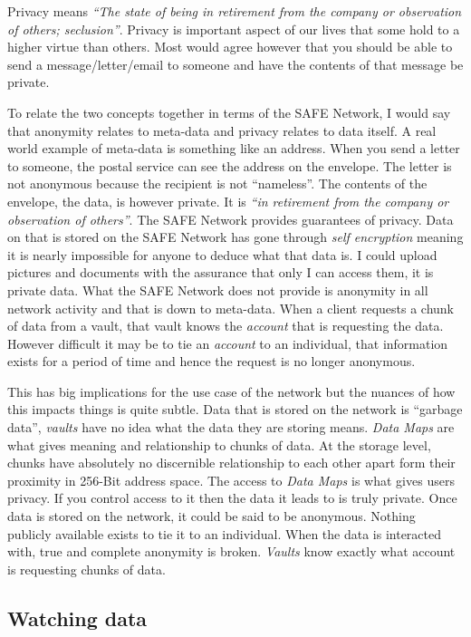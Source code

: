 Privacy means \textit{``The state of being in retirement from the company or observation of others; seclusion''}\cite{privacy}. Privacy is important aspect of our lives that some hold to a higher virtue than others. Most would agree however that you should be able to send a message/letter/email to someone and have the contents of that message be private.

To relate the two concepts together in terms of the SAFE Network, I would say that anonymity relates to meta-data and privacy relates to data itself. A real world example of meta-data is something like an address. When you send a letter to someone, the postal service can see the address on the envelope. The letter is not anonymous because the recipient is not ``nameless''. The contents of the envelope, the data, is however private. It is \textit{``in retirement from the company or observation of others''}. The SAFE Network provides guarantees of privacy. Data on that is stored on the SAFE Network has gone through \textit{self encryption} meaning it is nearly impossible for anyone to deduce what that data is. I could upload pictures and documents with the assurance that only I can access them, it is private data. What the SAFE Network does not provide is anonymity in all network activity and that is down to meta-data. When a client requests a chunk of data from a vault, that vault knows the \textit{account} that is requesting the data. However difficult it may be to tie an \textit{account} to an individual, that information exists for a period of time and hence the request is no longer anonymous.

This has big implications for the use case of the network but the nuances of how this impacts things is quite subtle. Data that is stored on the network is ``garbage data'', \textit{vaults} have no idea what the data they are storing means. \textit{Data Maps} are what gives meaning and relationship to chunks of data. At the storage level, chunks have absolutely no discernible relationship to each other apart form their proximity in 256-Bit address space. The access to \textit{Data Maps} is what gives users privacy. If you control access to it then the data it leads to is truly private. Once data is stored on the network, it could be said to be anonymous. Nothing publicly available exists to tie it to an individual. When the data is interacted with, true and complete anonymity is broken. \textit{Vaults} know exactly what account is requesting chunks of data.

\subsection{Watching data}

